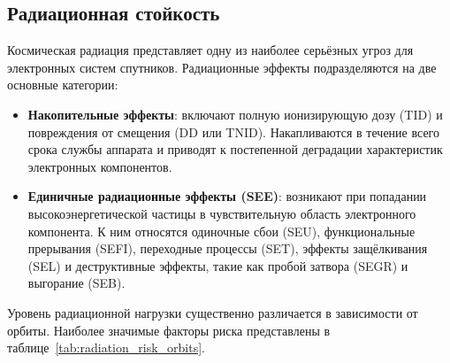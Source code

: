 \subsection{Радиационная стойкость}

Космическая радиация представляет одну из наиболее серьёзных угроз для
электронных систем спутников. Радиационные эффекты подразделяются на две
основные категории:

\begin{itemize}
	\item \textbf{Накопительные эффекты}: включают полную ионизирующую дозу
	      (TID) и повреждения от смещения (DD или TNID). Накапливаются в течение
	      всего срока службы аппарата и приводят к постепенной деградации
	      характеристик электронных компонентов\cite{esa_radiation_standard}.

	\item \textbf{Единичные радиационные эффекты (SEE)}: возникают при попадании
	      высокоэнергетической частицы в чувствительную область электронного
	      компонента. К ним относятся одиночные сбои (SEU), функциональные
	      прерывания (SEFI), переходные процессы (SET), эффекты защёлкивания (SEL)
	      и деструктивные эффекты, такие как пробой затвора (SEGR) и выгорание
	      (SEB)\cite{escc_see_test}.
\end{itemize}

Уровень радиационной нагрузки существенно различается в зависимости от орбиты.
Наиболее значимые факторы риска представлены в
таблице~\ref{tab:radiation_risk_orbits}.

